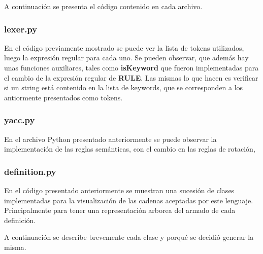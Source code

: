 A continuaci\'on se presenta el c\'odigo contenido en cada archivo.

\newpage
\subsubsection{lexer.py}



En el c\'odigo previamente mostrado se puede ver la lista de tokens utilizados, luego la expresi\'on regular para cada uno. Se pueden observar, que adem\'as hay unas funciones auxiliares, tales como \textbf{isKeyword} que fueron implementadas para el cambio de la expresi\'on regular de \textbf{RULE}. Las mismas lo que hacen es verificar si un string est\'a contenido en la lista de keywords, que se corresponden a los antiormente presentados como tokens.

\newpage
\subsubsection{yacc.py}



En el archivo Python presentado anteriormente se puede observar la implementaci\'on de las reglas sem\'anticas, con el cambio en las reglas de rotaci\'on, 

\newpage
\subsubsection{definition.py}



En el c\'odigo presentado anteriormente se muestran una sucesi\'on de clases implementadas para la visualizaci\'on de las cadenas aceptadas por este lenguaje. Principalmente para tener una representaci\'on arborea del armado de cada definici\'on.

A continuaci\'on se describe brevemente cada clase y porqu\'e se decidi\'o generar la misma.

